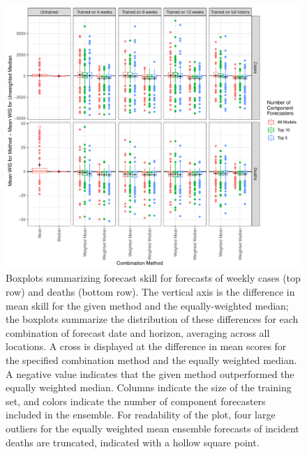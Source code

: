 \documentclass[review]{elsarticle}
\begin{document}
\begin{figure}
  \includegraphics[width=\textwidth]{figures/wis_boxplots_main.pdf}
  \caption{Boxplots summarizing forecast skill for forecasts of weekly cases (top row) and deaths (bottom row).
  The vertical axis is the difference in mean skill for the given method and the equally-weighted median;
  the boxplots summarize the distribution of these differences for each combination of forecast date and horizon, averaging across all locations.
  A cross is displayed at the difference in mean scores for the specified combination method and the equally weighted median.
  A negative value indicates that the given method outperformed the equally weighted median.
  Columns indicate the size of the training set, and colors indicate the number of component forecasters included in the ensemble.
  For readability of the plot, four large outliers for the equally weighted mean ensemble forecasts of incident deaths are truncated, indicated with a hollow square point.}
  \label{fig:overall_WIS_boxplots}
\end{figure}
\end{document}

